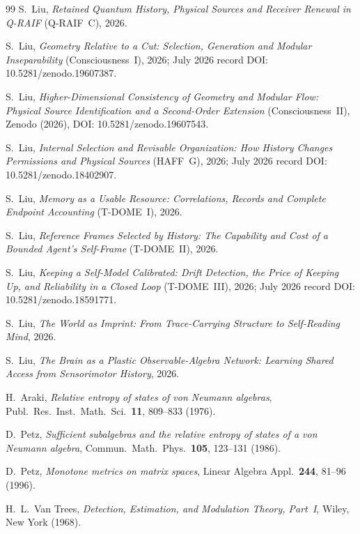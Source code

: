 \documentclass[12pt]{article}
\theoremstyle{definition}
\theoremstyle{remark}
\begin{document}
\begin{thebibliography}{99}
S.~Liu, \emph{Retained Quantum History, Physical Sources and Receiver Renewal in Q-RAIF} (Q-RAIF~C), 2026.


S.~Liu, \emph{Geometry Relative to a Cut: Selection, Generation and Modular Inseparability} (Consciousness~I), 2026; July 2026 record DOI: 10.5281/zenodo.19607387.

S.~Liu, \emph{Higher-Dimensional Consistency of Geometry and Modular Flow: Physical Source Identification and a Second-Order Extension} (Consciousness~II), Zenodo (2026), DOI: 10.5281/zenodo.19607543.

S.~Liu, \emph{Internal Selection and Revisable Organization: How History Changes Permissions and Physical Sources} (HAFF~G), 2026; July 2026 record DOI: 10.5281/zenodo.18402907.

S.~Liu, \emph{Memory as a Usable Resource: Correlations, Records and Complete Endpoint Accounting} (T-DOME~I), 2026.

S.~Liu, \emph{Reference Frames Selected by History: The Capability and Cost of a Bounded Agent's Self-Frame} (T-DOME~II), 2026.

S.~Liu, \emph{Keeping a Self-Model Calibrated: Drift Detection, the Price of Keeping Up, and Reliability in a Closed Loop} (T-DOME~III), 2026; July 2026 record DOI: 10.5281/zenodo.18591771.

S.~Liu, \emph{The World as Imprint: From Trace-Carrying Structure to Self-Reading Mind}, 2026.

S.~Liu, \emph{The Brain as a Plastic Observable-Algebra Network: Learning Shared Access from Sensorimotor History}, 2026.

H.~Araki,
\emph{Relative entropy of states of von Neumann algebras},
Publ.\ Res.\ Inst.\ Math.\ Sci.\ \textbf{11}, 809--833 (1976).

D.~Petz,
\emph{Sufficient subalgebras and the relative entropy of states of a von Neumann algebra},
Commun.\ Math.\ Phys.\ \textbf{105}, 123--131 (1986).

D.~Petz,
\emph{Monotone metrics on matrix spaces},
Linear Algebra Appl.\ \textbf{244}, 81--96 (1996).

H.~L.~Van Trees,
\emph{Detection, Estimation, and Modulation Theory, Part~I},
Wiley, New York (1968).


\end{thebibliography}
\end{document}
